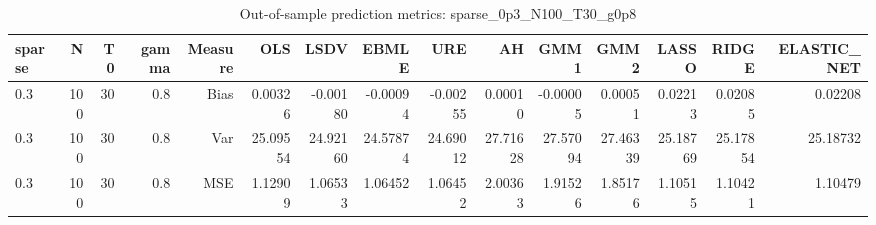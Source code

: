 \begin{table}[!htbp]\centering
\caption{Out-of-sample prediction metrics: sparse_0p3_N100_T30_g0p8}
\label{tab:table3_sparse_0p3_N100_T30_g0p8}
\begin{tabular}{lrrrrrrrrrrrrrr}
\hline
sparse & N & T0 & gamma & Measure & OLS & LSDV & EBMLE & URE & AH & GMM1 & GMM2 & LASSO & RIDGE & ELASTIC_NET \\
\hline
0.3 & 100 & 30 & 0.8 & Bias & 0.00326 & -0.00180 & -0.00094 & -0.00255 & 0.00010 & -0.00005 & 0.00051 & 0.02213 & 0.02085 & 0.02208 \\
0.3 & 100 & 30 & 0.8 & Var & 25.09554 & 24.92160 & 24.57874 & 24.69012 & 27.71628 & 27.57094 & 27.46339 & 25.18769 & 25.17854 & 25.18732 \\
0.3 & 100 & 30 & 0.8 & MSE & 1.12909 & 1.06533 & 1.06452 & 1.06452 & 2.00363 & 1.91526 & 1.85176 & 1.10515 & 1.10421 & 1.10479 \\
\hline
\end{tabular}
\end{table}

